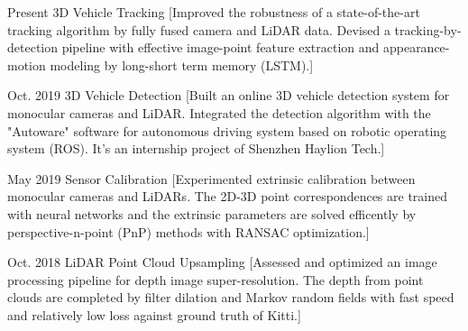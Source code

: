 \documentclass{resume}
\begin{document}
\begin{experiences}
  \experience%
    {Present}%
    {3D Vehicle Tracking}%
    [Improved the robustness of a state-of-the-art tracking algorithm by fully fused camera and LiDAR data. Devised a tracking-by-detection pipeline with effective image-point feature extraction and appearance-motion modeling by long-short term memory (LSTM).]

\separator{0.5ex}

  \experience%
    {Oct. 2019}%
    {3D Vehicle Detection}%
    [Built an online 3D vehicle detection system for monocular cameras and LiDAR. Integrated the detection algorithm with the "Autoware" software for autonomous driving system based on robotic operating system (ROS). It's an internship project of Shenzhen Haylion Tech.] 

\separator{0.5ex}

  \experience%
    {May 2019}%
    {Sensor Calibration}%
    [Experimented extrinsic calibration between monocular cameras and LiDARs. The 2D-3D point correspondences are trained with neural networks and the extrinsic parameters are solved efficently by perspective-n-point (PnP) methods with RANSAC optimization.]

\separator{0.5ex}

  \experience%
    {Oct. 2018}%
    {LiDAR Point Cloud Upsampling}%
    [Assessed and optimized an image processing pipeline for depth image super-resolution. The depth from point clouds are completed by filter dilation and Markov random fields with fast speed and relatively low loss against ground truth of Kitti.]   
    

\end{experiences}

\begin{competences}[12em]
\end{competences}
\end{document}
